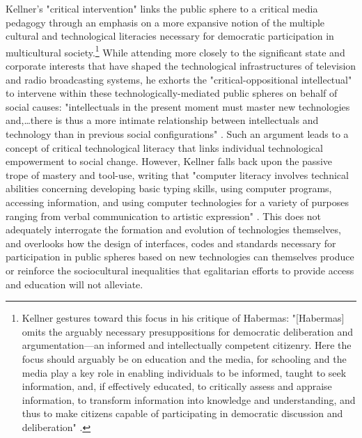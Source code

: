 Kellner's "critical intervention" links the public sphere to a critical media pedagogy through an emphasis on a more expansive notion of the multiple cultural and technological literacies necessary for democratic participation in multicultural society.\footnote{
  Kellner gestures toward this focus in his critique of Habermas: "[Habermas] omits the arguably necessary presuppositions for democratic deliberation and argumentation---an informed and intellectually competent citizenry. Here the focus should arguably be on education and the media, for schooling and the media play a key role in enabling individuals to be informed, taught to seek information, and, if effectively educated, to critically assess and appraise information, to transform information into knowledge and understanding, and thus to make citizens capable of participating in democratic discussion and deliberation" \autocite[277]{Kellner00}.
}
While attending more closely to the significant state and corporate interests that have shaped the technological infrastructures of television and radio broadcasting systems, he exhorts the "critical-oppositional intellectual" to intervene within these technologically-mediated public spheres on behalf of social causes: "intellectuals in the present moment must master new technologies and,…there is thus a more intimate relationship between intellectuals and technology than in previous social configurations" \autocite[438]{Kellner95}. Such an argument leads to a concept of critical technological literacy that links individual technological empowerment to social change. However, Kellner falls back upon the passive trope of mastery and tool-use, writing that "computer literacy involves technical abilities concerning developing basic typing skills, using computer programs, accessing information, and using computer technologies for a variety of purposes ranging from verbal communication to artistic expression" \autocite[116]{Kellner98}. This does not adequately interrogate the formation and evolution of technologies themselves, and overlooks how the design of interfaces, codes and standards necessary for participation in public spheres based on new technologies can themselves produce or reinforce the sociocultural inequalities that egalitarian efforts to provide access and education will not alleviate.

